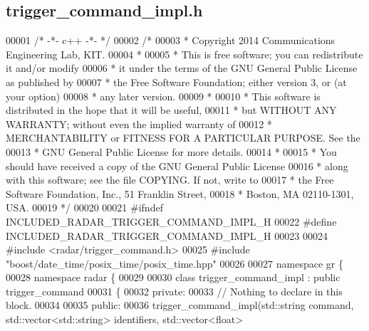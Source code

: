 \subsection{trigger\+\_\+command\+\_\+impl.\+h}
\label{trigger__command__impl_8h_source}

\begin{DoxyCode}
00001 \textcolor{comment}{/* -*- c++ -*- */}
00002 \textcolor{comment}{/* }
00003 \textcolor{comment}{ * Copyright 2014 Communications Engineering Lab, KIT.}
00004 \textcolor{comment}{ * }
00005 \textcolor{comment}{ * This is free software; you can redistribute it and/or modify}
00006 \textcolor{comment}{ * it under the terms of the GNU General Public License as published by}
00007 \textcolor{comment}{ * the Free Software Foundation; either version 3, or (at your option)}
00008 \textcolor{comment}{ * any later version.}
00009 \textcolor{comment}{ * }
00010 \textcolor{comment}{ * This software is distributed in the hope that it will be useful,}
00011 \textcolor{comment}{ * but WITHOUT ANY WARRANTY; without even the implied warranty of}
00012 \textcolor{comment}{ * MERCHANTABILITY or FITNESS FOR A PARTICULAR PURPOSE.  See the}
00013 \textcolor{comment}{ * GNU General Public License for more details.}
00014 \textcolor{comment}{ * }
00015 \textcolor{comment}{ * You should have received a copy of the GNU General Public License}
00016 \textcolor{comment}{ * along with this software; see the file COPYING.  If not, write to}
00017 \textcolor{comment}{ * the Free Software Foundation, Inc., 51 Franklin Street,}
00018 \textcolor{comment}{ * Boston, MA 02110-1301, USA.}
00019 \textcolor{comment}{ */}
00020 
00021 \textcolor{preprocessor}{#ifndef INCLUDED\_RADAR\_TRIGGER\_COMMAND\_IMPL\_H}
00022 \textcolor{preprocessor}{#define INCLUDED\_RADAR\_TRIGGER\_COMMAND\_IMPL\_H}
00023 
00024 \textcolor{preprocessor}{#include <radar/trigger_command.h>}
00025 \textcolor{preprocessor}{#include "boost/date\_time/posix\_time/posix\_time.hpp"}
00026 
00027 \textcolor{keyword}{namespace }gr \{
00028   \textcolor{keyword}{namespace }radar \{
00029 
00030     \textcolor{keyword}{class }trigger_command_impl : \textcolor{keyword}{public} trigger_command
00031     \{
00032      \textcolor{keyword}{private}:
00033       \textcolor{comment}{// Nothing to declare in this block.}
00034 
00035      \textcolor{keyword}{public}:
00036       trigger_command_impl(std::string command, std::vector<std::string> identifiers, std::vector<float> 

\end{DoxyCode}
